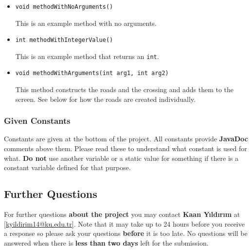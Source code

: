 \documentclass[a4paper]{article}
\makeatletter
\newcommand{\contactName}{Kaan Yıldırım}
\newcommand{\contactMail}{kyildirim14@ku.edu.tr}
\makeatother
\begin{document}
\begin{itemize}

\item

\begin{lstlisting}
void methodWithNoArguments()
\end{lstlisting}
This is an example method with no arguments.
\item
\begin{lstlisting}
int methodWithIntegerValue()
\end{lstlisting}

This is an example method that returns an \lstinline{int}.
\item
\begin{lstlisting}
void methodWithArguments(int arg1, int arg2)
\end{lstlisting}
This method constructs the roads and the crossing and adds them to the screen. See below for how the roads are created individually.

\end{itemize}

\subsubsection{Given Constants}
Constants are given at the bottom of the project. All constants provide \textbf{JavaDoc} comments above them. Please read these to understand what constant is used for what. \textbf{Do not} use another variable or a static value for something if there is a constant variable defined for that purpose.

\subsection{Further Questions}
For further questions \textbf{about the project} you may contact \textbf{\contactName} at \href{mailto:\contactMail}{\mbox{[\contactMail]}}. Note that it may take up to 24 hours before you receive a response so please ask your questions \textbf{before} it is too late. No questions will be answered when there is \textbf{less than two days} left for the submission.
\end{document}
